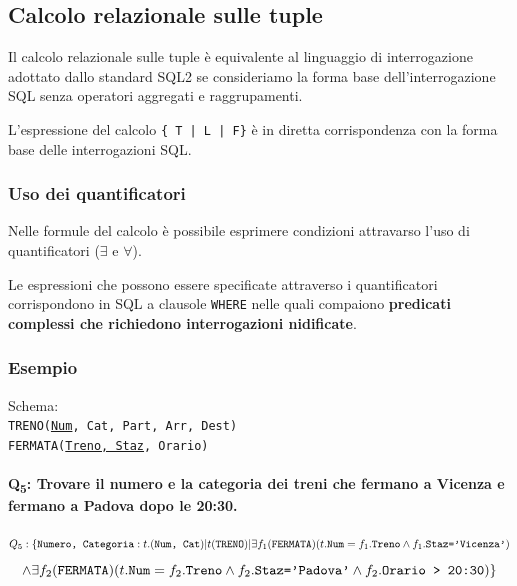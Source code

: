 \documentclass{report}
\begin{document}
\subsection{Calcolo relazionale sulle tuple}

Il calcolo relazionale sulle tuple \`e equivalente al linguaggio di interrogazione adottato dallo standard SQL2 se consideriamo la forma base dell'interrogazione SQL senza operatori aggregati e raggrupamenti. 

L'espressione del calcolo \texttt{\{ T | L | F\}} \`e in diretta corrispondenza con la forma base delle interrogazioni SQL.
\begin{center}
\end{center}

\subsubsection{Uso dei quantificatori}

Nelle formule del calcolo \`e possibile esprimere condizioni attravarso l'uso di quantificatori ($\exists$ e $\forall$).

Le espressioni che possono essere specificate attraverso i quantificatori corrispondono in SQL a clausole \texttt{WHERE} nelle quali compaiono \textbf{predicati complessi che richiedono interrogazioni nidificate}.

\subsubsection{Esempio}
Schema:\\
\texttt{TRENO(\underline{Num}, Cat, Part, Arr, Dest)\\
FERMATA(\underline{Treno, Staz}, Orario)}

\paragraph{Q\textsubscript{5}: Trovare il numero e la categoria dei treni che fermano a Vicenza e fermano a Padova dopo le 20:30.}

\[ Q_5: \{\text{\texttt{Numero, Categoria}}:t.(\text{\texttt{Num, Cat}})| t(\text{\texttt{TRENO}}) | \exists f_1(\text{\texttt{FERMATA}}) (t.\text{\texttt{Num}} = f_1.\text{\texttt{Treno}}\wedge f_1.\text{\texttt{Staz='Vicenza'}\\})\]
\[ \wedge \exists f_2(\text{\texttt{FERMATA}}) (t.\text{\texttt{Num}} = f_2.\text{\texttt{Treno}}\wedge f_2.\text{\texttt{Staz='Padova'}} \wedge f_2.\text{\texttt{Orario > 20:30}})\} \]
\end{document}
